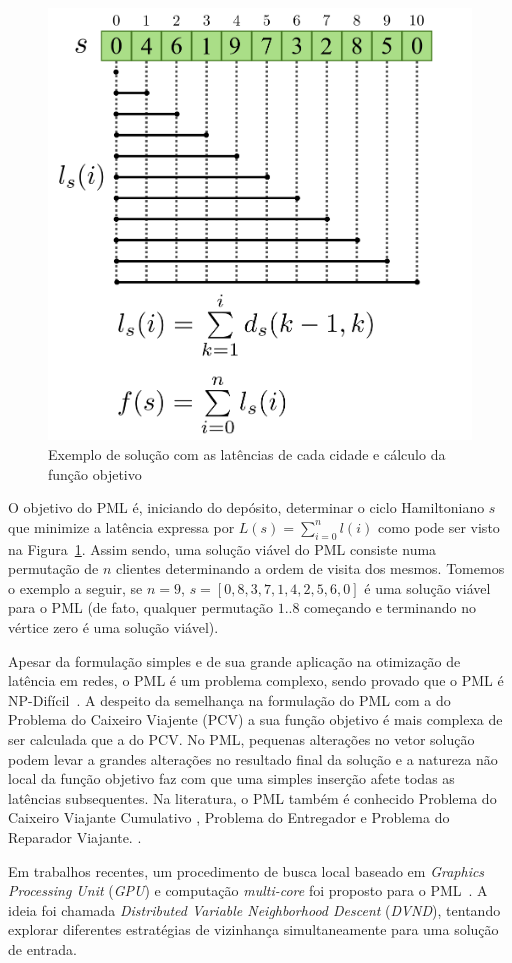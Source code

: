 \begin{figure}[htpb]
    \centering
    \includegraphics[width=0.6\linewidth]{figuras/pml/mlp}
    \caption{Exemplo de solução com as latências de cada cidade e cálculo da função objetivo}
    \label{fig:pmlDiagramaFormulas}
\end{figure}

O objetivo do PML é, iniciando do depósito, determinar o ciclo Hamiltoniano $s$ que minimize a latência expressa por $L(s)=\sum_{i=0}^{n} l(i)$ como pode ser visto na Figura~\ref{fig:pmlDiagramaFormulas}.
Assim sendo, uma solução viável do PML consiste numa permutação de $n$ clientes determinando a ordem de visita dos mesmos. Tomemos o exemplo a seguir, se $n=9$,  $s=[0,8,3,7,1,4,2,5,6,0]$ é uma solução viável para o PML (de fato, qualquer permutação $1..8$ começando e terminando no vértice zero é uma solução viável).

Apesar da formulação simples e de sua grande aplicação na otimização de latência em redes, o PML é um problema complexo, sendo provado que o PML é NP-Difícil~\cite{silva2012}. A despeito da semelhança na formulação do PML com a do Problema do Caixeiro Viajente (PCV) a sua função objetivo é mais complexa de ser calculada que a do PCV.
No PML, pequenas alterações no vetor solução podem levar a grandes alterações no resultado final da solução e a natureza não local da função objetivo faz com que uma simples inserção afete todas as latências subsequentes.
Na literatura, o PML também é conhecido Problema do Caixeiro Viajante Cumulativo \cite{bianco1993}, Problema do Entregador \cite{mladenovic2013} e Problema do Reparador Viajante. \cite{tsitsiklis1992}.

Em trabalhos recentes, um procedimento de busca local baseado em \emph{Graphics Processing Unit} (\emph{GPU}) e computação \emph{multi-core} foi proposto para o PML~\cite{wamca2016}.
A ideia foi chamada \emph{Distributed Variable Neighborhood Descent} (\emph{DVND}), tentando explorar diferentes estratégias de vizinhança simultaneamente para uma solução de entrada.

